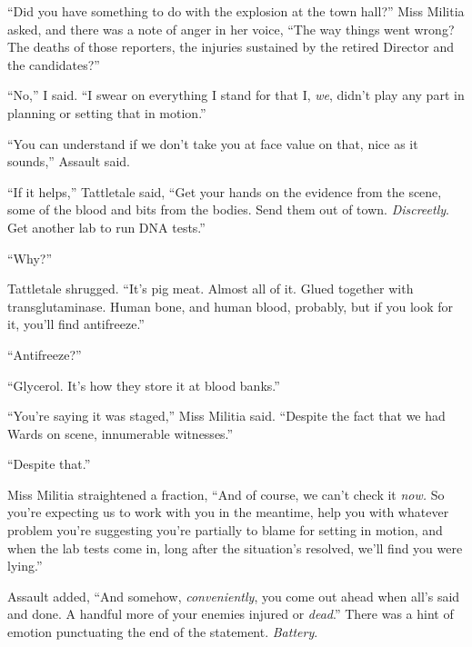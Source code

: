 ``Did you have something to do with the explosion at the town hall?''  Miss Militia asked, and there was a note of anger in her voice, ``The way things went wrong?  The deaths of those reporters, the injuries sustained by the retired Director and the candidates?''



``No,'' I said.  ``I swear on everything I stand for that I, \emph{we}, didn't play any part in planning or setting that in motion.''



``You can understand if we don't take you at face value on that, nice as it sounds,'' Assault said.



``If it helps,'' Tattletale said, ``Get your hands on the evidence from the scene, some of the blood and bits from the bodies.  Send them out of town.  \emph{Discreetly}.  Get another lab to run DNA tests.''



``Why?''



Tattletale shrugged.  ``It's pig meat.  Almost all of it.  Glued together with transglutaminase.  Human bone, and human blood, probably, but if you look for it, you'll find antifreeze.''



``Antifreeze?''



``Glycerol.  It's how they store it at blood banks.''



``You're saying it was staged,'' Miss Militia said.  ``Despite the fact that we had Wards on scene, innumerable witnesses.''



``Despite that.''



Miss Militia straightened a fraction, ``And of course, we can't check it \emph{now.  }So you're expecting us to work with you in the meantime, help you with whatever problem you're suggesting you're partially to blame for setting in motion, and when the lab tests come in, long after the situation's resolved, we'll find you were lying.''



Assault added, ``And somehow, \emph{conveniently}, you come out ahead when all's said and done.  A handful more of your enemies injured or \emph{dead}.''  There was a hint of emotion punctuating the end of the statement.  \emph{Battery}.



